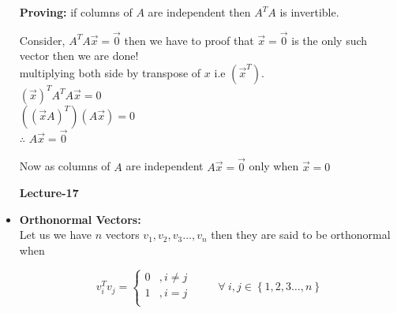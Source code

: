 \documentclass[a4paper,11pt]{article}
\numberwithin{equation}{section}
\begin{document}
\begin{itemize}
\textbf{Proving: }if columns of $A$ are independent then $A^TA$ is invertible.
\begin{center}
    Consider, $A^TA\vec{x}=\vec{0}$  then we have to proof that $\vec{x}=\vec{0}$ is the only such vector then we are done!\\
    multiplying both side by transpose of $x$ i.e $(\vec{x}^T)$.\\
    \vspace{4pt}
    $(\vec{x})^TA^TA\vec{x}=0$\\ \vspace{3pt}
    $((\vec{x}A)^T)(A\vec{x})=0$\\ \vspace{3pt}
    $\therefore$ $A\vec{x}=\vec{0}$
\end{center}
Now as columns of $A$ are independent $A\vec{x}=\vec{0}$ only when $\vec{x}=0$

\begin{center}
    \Huge{\textbf{Lecture-17}}
\end{center}
\vspace{5pt}

\item \textbf{Orthonormal Vectors: }\\
Let us we have $n$ vectors $v_1,v_2,v_3\dots,v_n$ then they are said to be orthonormal when 
\begin{center}
    \[  v_i^Tv_j=
        \begin{cases}
        0 & ,i\neq j\\
        1 & ,i=j\\ 
        \end{cases}\hspace{1cm} \forall \hspace{3pt} i,j\in \left\{1,2,3\dots,n\right\}
    \]
\end{center}


\end{itemize}
\end{document}
